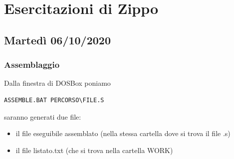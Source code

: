 \documentclass[11pt]{report}
\begin{document}


\part{Esercitazioni di Zippo}

\chapter{Martedì 06/10/2020}
\section{Assemblaggio}
Dalla finestra di DOSBox poniamo
\begin{verbatim}
ASSEMBLE.BAT PERCORSO\FILE.S
\end{verbatim}
saranno generati due file: 
\begin{itemize}
\item il file eseguibile assemblato (nella stessa cartella dove si trova il file .s)
\item il file listato.txt (che si trova nella cartella WORK)
\end{itemize}
\end{document}
